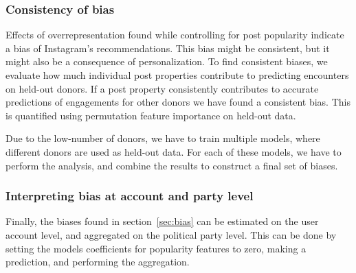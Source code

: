 \documentclass[a4paper]{article}
\begin{document}
\subsubsection{Consistency of bias}
Effects of overrepresentation found while controlling for post popularity
indicate a bias of Instagram's recommendations. This bias might be
consistent, but it might also be a consequence of personalization. To find
consistent biases, we evaluate how much individual post properties contribute
to predicting encounters on held-out donors. If a post property consistently
contributes to accurate predictions of engagements for other donors we have
found a consistent bias. This is quantified using permutation feature
importance on held-out data.

Due to the low-number of donors, we have to train multiple models, where
different donors are used as held-out data. For each of these models, we have
to perform the analysis, and combine the results to construct a final
set of biases.

\subsubsection{Interpreting bias at account and party level}
Finally, the biases found in section~\ref{sec:bias} can be estimated on the
user account level, and aggregated on the political party level. This can be
done by setting the models coefficients for popularity features to zero, 
making a prediction, and performing the aggregation. 

\todos
\end{document}
